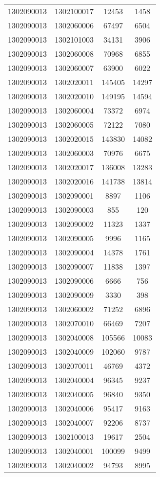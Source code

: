 \begin{longtable}{llcc}
1302090013 & 1302100017 & 12453 & 1458\\
1302090013 & 1302060006 & 67497 & 6504\\
1302090013 & 1302101003 & 34131 & 3906\\
1302090013 & 1302060008 & 70968 & 6855\\
1302090013 & 1302060007 & 63900 & 6022\\
1302090013 & 1302020011 & 145405 & 14297\\
1302090013 & 1302020010 & 149195 & 14594\\
1302090013 & 1302060004 & 73372 & 6974\\
1302090013 & 1302060005 & 72122 & 7080\\
1302090013 & 1302020015 & 143830 & 14082\\
1302090013 & 1302060003 & 70976 & 6675\\
1302090013 & 1302020017 & 136008 & 13283\\
1302090013 & 1302020016 & 141738 & 13814\\
1302090013 & 1302090001 & 8897 & 1106\\
1302090013 & 1302090003 & 855 & 120\\
1302090013 & 1302090002 & 11323 & 1337\\
1302090013 & 1302090005 & 9996 & 1165\\
1302090013 & 1302090004 & 14378 & 1761\\
1302090013 & 1302090007 & 11838 & 1397\\
1302090013 & 1302090006 & 6666 & 756\\
1302090013 & 1302090009 & 3330 & 398\\
1302090013 & 1302060002 & 71252 & 6896\\
1302090013 & 1302070010 & 66469 & 7207\\
1302090013 & 1302040008 & 105566 & 10083\\
1302090013 & 1302040009 & 102060 & 9787\\
1302090013 & 1302070011 & 46769 & 4372\\
1302090013 & 1302040004 & 96345 & 9237\\
1302090013 & 1302040005 & 96840 & 9350\\
1302090013 & 1302040006 & 95417 & 9163\\
1302090013 & 1302040007 & 92206 & 8737\\
1302090013 & 1302100013 & 19617 & 2504\\
1302090013 & 1302040001 & 100099 & 9499\\
1302090013 & 1302040002 & 94793 & 8995\\

\end{longtable}
